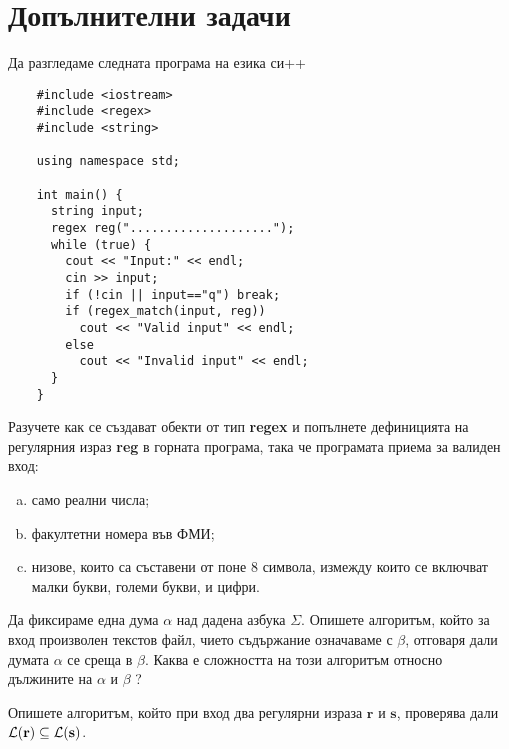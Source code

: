 \section{Допълнителни задачи}

\begin{problem}
  Да разгледаме следната програма на езика си++
  \begin{verbatim}
    #include <iostream>
    #include <regex>
    #include <string>
    
    using namespace std;
    
    int main() {
      string input;
      regex reg("....................");
      while (true) {
        cout << "Input:" << endl;
        cin >> input;
        if (!cin || input=="q") break;
        if (regex_match(input, reg))
          cout << "Valid input" << endl;
        else
          cout << "Invalid input" << endl;	  
      }
    }
  \end{verbatim}
  Разучете как се създават обекти от тип {\bf regex} и попълнете дефиницията на регулярния израз {\bf reg} в горната програма, така че програмата приема за валиден вход:
  \begin{enumerate}[a)]
  \item 
    само реални числа;
  \item
    факултетни номера във ФМИ;
  \item
    низове, които са съставени от поне 8 символа, измежду които се включват малки букви, големи букви,
    и цифри.    
  \end{enumerate}
\end{problem}

\begin{problem}
  Да фиксираме една дума $\alpha$ над дадена азбука $\Sigma$.
  Опишете алгоритъм, който за вход произволен текстов файл, чието съдържание означаваме с $\beta$,
  отговаря дали думата $\alpha$ се среща в $\beta$.
  Каква е сложността на този алгоритъм относно дължините на $\alpha$ и $\beta$ ?
\end{problem}

\begin{problem}
  Опишете алгоритъм, който при вход два регулярни израза $\mathbf{r}$ и $\mathbf{s}$,
  проверява дали $\mathcal{L}(\mathbf{r}) \subseteq \mathcal{L}(\mathbf{s})$.
\end{problem}


